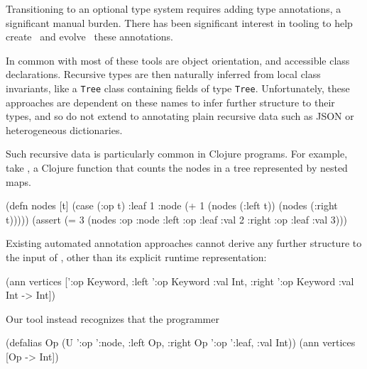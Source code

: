 
Transitioning to an optional type system
requires adding type annotations,
a significant manual burden.
There has been significant interest in 
tooling to help create~\cite{saftoiu2010jstrace,pyannotate,typette18,An10dynamicinference,pytype} and
evolve~\cite{kristensen2017inference}
these annotations.

In common with most of these tools are
object orientation, %
and accessible class declarations.
Recursive types are then naturally inferred from local class invariants,
like a \texttt{Tree} class containing fields of type \texttt{Tree}.
Unfortunately, these approaches are dependent on these names to infer
further structure to their types, and so
do not extend to annotating plain recursive data
such as JSON or heterogeneous dictionaries.

Such recursive data is particularly common in Clojure programs.
For example, take , a Clojure function that counts
the nodes in a tree represented by nested maps.
\begin{cljlisting}
(defn nodes [t]
  (case (:op t)
    :leaf 1
    :node (+ 1 (nodes (:left t))
               (nodes (:right t)))))
(assert (= 3 (nodes
               {:op :node 
                :left {:op :leaf :val 2}
                :right {:op :leaf :val 3}})))
\end{cljlisting}
%
Existing automated annotation approaches cannot derive
any further structure to the input of , other
than its explicit runtime representation:
%
\begin{cljlisting}
(ann vertices ['{:op Keyword,
                 :left '{:op Keyword :val Int},
                 :right '{:op Keyword :val Int}}
               -> Int])
\end{cljlisting}
%
Our tool instead recognizes that the programmer
%
\begin{cljlisting}
(defalias Op 
  (U '{:op ':node, :left Op, :right Op}
     '{:op ':leaf, :val Int}))
(ann vertices [Op -> Int])
\end{cljlisting}

%


